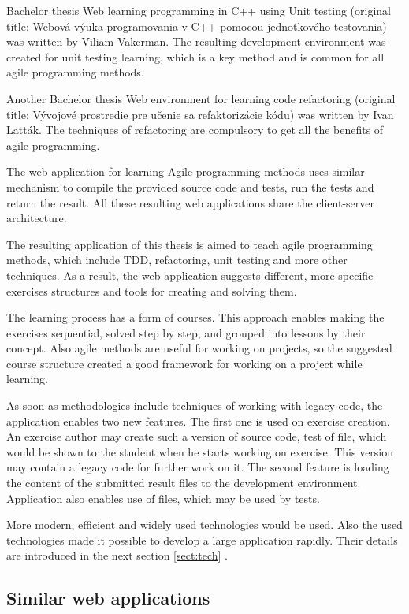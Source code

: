 Bachelor thesis Web learning programming in C++ using Unit testing (original title: Webová výuka programovania v C++ pomocou jednotkového testovania) was written by Viliam Vakerman. The resulting development environment was created for unit testing learning, which is a key method and is common for all agile programming methods. 

Another Bachelor thesis Web environment for learning code refactoring (original title: Vývojové prostredie pre učenie sa refaktorizácie kódu) was written by Ivan Latták. The techniques of refactoring are compulsory to get all the benefits of agile programming.

The web application for learning Agile programming methods uses similar mechanism to compile the provided source code and tests, run the tests and return the result. All these resulting web applications share the client-server architecture.

The resulting application of this thesis is aimed to teach agile programming methods, which include TDD, refactoring, unit testing and more other techniques. As a result, the web application suggests different, more specific exercises structures and tools for creating and solving them. 

The learning process has a form of courses. This approach enables making the exercises sequential, solved step by step, and grouped into lessons by their concept. Also agile methods are useful for working on projects, so the suggested course structure created a good framework for working on a project while learning.

As soon as methodologies include techniques of working with legacy code, the application enables two new features. The first one is used on exercise creation. An exercise author may create such a version of source code, test of file, which would be shown to the student when he starts working on exercise. This version may contain a legacy code for further work on it. The second feature is loading the content of the submitted result files to the development environment. Application also enables use of files, which may be used by tests.

More modern, efficient and widely used technologies would be used. Also the used technologies made it possible to develop a large application rapidly. Their details are introduced in the next section \ref{sect:tech} .

\subsection{Similar web applications}

